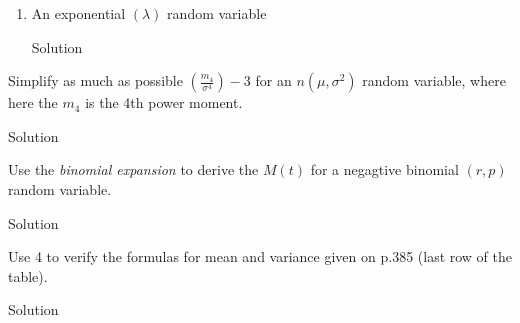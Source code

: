 \documentclass{article}
\begin{document}
\begin{spacing}{1.1}
\begin{homeworkProblem}
\begin{enumerate}[(1)]
\begin{homeworkSection}{Solution}
\begin{align*}
  | Factor out constants:
= | (n-1) n p^2 (e^(2 t) (p e^t-p+1)^(n-2) (2 (\frac{ d}{ dt} (t)))+(n-2) p e^(3 t) (p e^t-p+1)^(n-3))+n p ((n-1) p e^(2 t) (p e^t-p+1)^(n-2)+e^t (p e^t-p+1)^(n-1))
  | The derivative of t is 1:
= | (n-1) n p^2 ((n-2) p e^(3 t) (p e^t-p+1)^(n-3)+2 e^(2 t) (p e^t-p+1)^(n-2))+n p ((n-1) p e^(2 t) (p e^t-p+1)^(n-2)+e^t (p e^t-p+1)^(n-1))
            &= n p e^t (p (e^t - 1) + 1)^{n - 3} (p^2 (n^2 e^2t + (1 - 3 n) e^t + 1) 
            + p ((3n - 1) e^t -2) + 1)\\
          \text{Hence}\\
          M'''(0) &=
      \end{align*}
      \end{homeworkSection}
    \item An exponential $(\lambda)$ random variable
      \begin{homeworkSection}{Solution}
        
      \end{homeworkSection}
  \end{enumerate}
\end{homeworkProblem}

\newpage
\begin{homeworkProblem}
  Simplify as much as possible $\left(\frac{ m_4}{ \sigma^4}\right) - 3$ 
  for an $n(\mu, \sigma^2)$ random variable, where here the $m_4$ is the
  4th power moment.
  \begin{homeworkSection}{Solution}
    
  \end{homeworkSection}
\end{homeworkProblem}

\newpage
\begin{homeworkProblem}
  Use the \emph{binomial expansion} to derive the $M(t)$ for a negagtive
  binomial $(r, p)$ random variable.
  \begin{homeworkSection}{Solution}
    
  \end{homeworkSection}
\end{homeworkProblem}
\newpage
\begin{homeworkProblem}
  Use 4 to verify the formulas for mean and variance given on p.385 
  (last row of the table).
  \begin{homeworkSection}{Solution}
    
  \end{homeworkSection}
\end{homeworkProblem}
  
\end{spacing}
\end{document}

